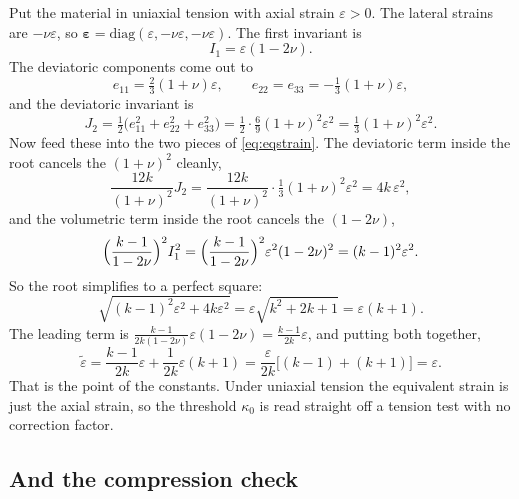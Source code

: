 \documentclass[11pt]{article}
\newcommand{\eps}{\bm{\varepsilon}}
\newcommand{\eqs}{\tilde{\varepsilon}}
\begin{document}
Put the material in uniaxial tension with axial strain $\varepsilon>0$. The lateral
strains are $-\nu\varepsilon$, so $\eps = \mathrm{diag}(\varepsilon,-\nu\varepsilon,-\nu\varepsilon)$.
The first invariant is
%
\begin{equation}
I_1 = \varepsilon(1-2\nu).
\end{equation}
%
The deviatoric components come out to
%
\begin{equation}
e_{11} = \tfrac{2}{3}(1+\nu)\varepsilon, \qquad
e_{22}=e_{33} = -\tfrac{1}{3}(1+\nu)\varepsilon,
\end{equation}
%
and the deviatoric invariant is
%
\begin{equation}
J_2 = \tfrac{1}{2}\bigl(e_{11}^2+e_{22}^2+e_{33}^2\bigr)
    = \tfrac{1}{2}\cdot\tfrac{6}{9}(1+\nu)^2\varepsilon^2
    = \tfrac{1}{3}(1+\nu)^2\varepsilon^2.
\end{equation}
%
Now feed these into the two pieces of \eqref{eq:eqstrain}. The deviatoric term inside the
root cancels the $(1+\nu)^2$ cleanly,
%
\begin{equation}
\frac{12k}{(1+\nu)^2}J_2 = \frac{12k}{(1+\nu)^2}\cdot\tfrac{1}{3}(1+\nu)^2\varepsilon^2 = 4k\,\varepsilon^2,
\end{equation}
%
and the volumetric term inside the root cancels the $(1-2\nu)$,
%
\begin{equation}
\Bigl(\frac{k-1}{1-2\nu}\Bigr)^2 I_1^2
= \Bigl(\frac{k-1}{1-2\nu}\Bigr)^2 \varepsilon^2(1-2\nu)^2 = (k-1)^2\varepsilon^2.
\end{equation}
%
So the root simplifies to a perfect square:
%
\begin{equation}
\sqrt{(k-1)^2\varepsilon^2 + 4k\varepsilon^2}
= \varepsilon\sqrt{k^2+2k+1} = \varepsilon(k+1).
\end{equation}
%
The leading term is $\frac{k-1}{2k(1-2\nu)}\varepsilon(1-2\nu) = \frac{k-1}{2k}\varepsilon$, and putting
both together,
%
\begin{equation}
\eqs = \frac{k-1}{2k}\varepsilon + \frac{1}{2k}\varepsilon(k+1)
     = \frac{\varepsilon}{2k}\bigl[(k-1)+(k+1)\bigr] = \varepsilon.
\end{equation}
%
That is the point of the constants. Under uniaxial tension the equivalent strain is just
the axial strain, so the threshold $\kappa_0$ is read straight off a tension test with no
correction factor.

\subsection{And the compression check}
\end{document}
